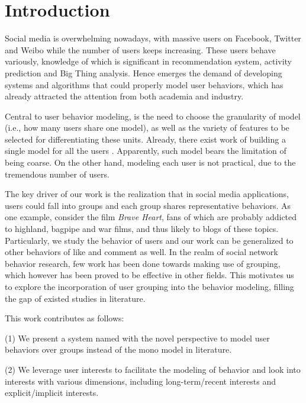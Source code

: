 \section{Introduction}
\label{sec:intro}

Social media is overwhelming nowadays, with massive users on Facebook, Twitter and Weibo while the number of users keeps increasing.
These users behave variously, knowledge of which is significant in recommendation system, activity prediction and Big Thing analysis.
Hence emerges the demand of developing systems and algorithms that could properly model user behaviors, which has already attracted the attention from both academia and industry.

Central to user behavior modeling, is the need to choose the granularity of model (i.e., how many users share one model), as well as the variety of features to be selected for differentiating these units.
Already, there exist work of building a single model for all the users \cite{IEEEexample:conf/wsdm/FengW13,IEEEexample:conf/ijcai/ZhangLTCL13,IEEEexample:journals/tkdd/ZhangTLLX15}.
Apparently, such model bears the limitation of being coarse.
On the other hand, modeling each user is not practical, due to the tremendous number of users.

The key driver of our work is the realization that in social media applications, users could fall into groups and each group shares representative behaviors.
%
As one example, consider the film \textit{Brave Heart}, fans of which are probably addicted to highland, bagpipe and war films, and thus likely to \ret{} blogs of these topics.
Particularly, we study the \retg{} behavior of users and our work can be generalized to other behaviors of like and comment as well. 
In the realm of social network behavior research, few work has been done towards making use of grouping, which however has been proved to be effective in other fields.
This motivates us to explore the incorporation of user grouping into the \retg{} behavior modeling, filling the gap of existed studies in literature.

This work contributes as follows:

\stab(1) We present a system named \sys{} with the novel perspective to model user behaviors over groups instead of the mono model in literature.

\stab(2) We leverage user interests to facilitate the modeling of \retg{} behavior and look into interests with various dimensions, including long-term/recent interests and explicit/implicit interests.

